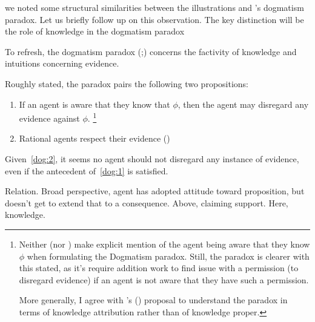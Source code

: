 \begin{note}
   we noted some structural similarities between the illustrations and \citeauthor{Kripke:2011wv}'s dogmatism paradox.
  Let us briefly follow up on this observation.
  The key distinction will be the role of knowledge in the dogmatism paradox
\end{note}

\begin{note}
  To refresh, the dogmatism paradox (\cite[39,43--45]{Kripke:2011wv};\cite[148]{Harman:1973ww}) concerns the factivity of knowledge and intuitions concerning evidence.

  Roughly stated, the paradox pairs the following two propositions:
  \begin{enumerate}[label=D\arabic*., ref=(D\arabic*)]
  \item\label{dog:1} If an agent is aware that they know that \(\phi\), then the agent may disregard any evidence against \(\phi\).\nolinebreak
    \footnote{
      Neither \citeauthor{Kripke:2011wv} (nor \citeauthor{Harman:1973ww}) make explicit mention of the agent being aware that they know \(\phi\) when formulating the Dogmatism paradox.
      Still, the paradox is clearer with this stated, as it's require addition work to find issue with a permission (to disregard evidence) if an agent is not aware that they have such a permission.

      More generally, I agree with \citeauthor{Zhaoqing:2015vj}'s (\Citeyear{Zhaoqing:2015vj}) proposal to understand the paradox in terms of knowledge attribution rather than of knowledge proper.
    }
  \item\label{dog:2} Rational agents respect their evidence
    (\cite[Cf.][\S2]{Kelly:2016wk})
  \end{enumerate}
  Given~\ref{dog:2}, it seems no agent should not disregard any instance of evidence, even if the antecedent of~\ref{dog:1} is satisfied.
\end{note}

\begin{note}
  Relation.
  Broad perspective, agent has adopted attitude toward proposition, but doesn't get to extend that to a consequence.
  Above, claiming support.
  Here, knowledge.
\end{note}

